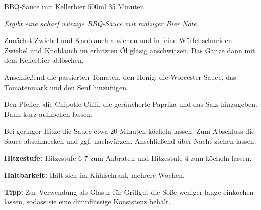 \documentclass[
  DIV=11,%
  pagesize,%
  fontsize=11pt,%
  paper=a4,%
]{scrartcl}
\begin{document}
\begin{recipe}{BBQ-Sauce mit Kellerbier} {500ml} {35 Minuten}

\freeform
\textit{Ergibt eine scharf würzige BBQ-Sauce mit malziger Bier Note.}


Zunächst Zwiebel und Knoblauch abziehen und in feine Würfel schneiden.
Zwiebel und Knoblauch im erhitzten Öl glasig anschwitzen.
Das Ganze dann mit dem Kellerbier ablöschen.


Anschließend die passierten Tomaten, den Honig, die Worcester Sauce, das Tomatenmark und den Senf hinzufügen.


Den Pfeffer, die Chipotle Chili, die geräucherte Paprika und das Salz hinzugeben.
Dann kurz aufkochen lassen.

\newstep
Bei geringer Hitze die Sauce etwa 20 Minuten köcheln lassen.
Zum Abschluss die Sauce abschmecken und ggf. nachwürzen.
Anschließend über Nacht ziehen lassen.

\freeform
\hrulefill

\freeform 
\textbf{Hitzestufe:}
Hitzestufe 6-7 zum Anbraten und Hitzestufe 4 zum köcheln lassen.

\freeform 
\textbf{Haltbarkeit:}
Hält sich im Kühlschrank mehrere Wochen.

\freeform 
\textbf{Tipp:}
Zur Verwendung als Glasur für Grillgut die Soße weniger lange einkochen lassen, sodass sie eine dünnflüssige Konsistenz behält.

\end{recipe}
\end{document}
